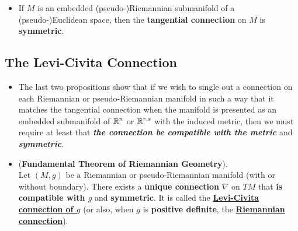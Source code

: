 \documentclass[11pt]{article}
\begin{document}
\begin{itemize}
\item \begin{proposition}
If $M$ is an embedded (pseudo-)Riemannian submanifold of a (pseudo-)Euclidean space, then the \textbf{tangential connection} on $M$ is \textbf{symmetric}.
\end{proposition}
\end{itemize}
\subsection{The Levi-Civita Connection}
\begin{itemize}
\item \begin{remark}
The last two propositions show that if we wish to single out a connection on each Riemannian or pseudo-Riemannian manifold in such a way that it matches the tangential connection when the manifold is presented as an embedded submanifold of ${\mathbb R}^n$ or ${\mathbb R}^{r,s}$ with the induced metric, then we must require at least that \emph{\textbf{the connection be compatible with the metric}} and \emph{\textbf{symmetric}}. 
\end{remark}

\item \begin{theorem} (\textbf{Fundamental Theorem of Riemannian Geometry}). \citep{lee2018introduction}\\
Let $(M, g)$ be a Riemannian or pseudo-Riemannian manifold (with or without boundary). There exists a \textbf{unique connection} $\nabla$ on $TM$ that \textbf{is compatible with $g$} and \textbf{symmetric}. It is called the \underline{\textbf{Levi-Civita connection of $g$}} (or also, when $g$ is \textbf{positive definite}, the \underline{\textbf{Riemannian connection}}).
\end{theorem}


\end{itemize}
\end{document}
